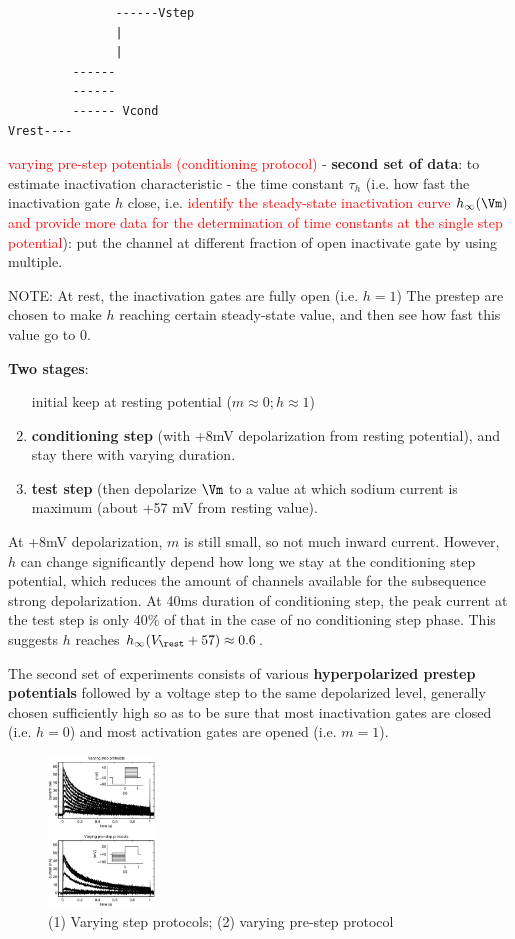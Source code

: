 \begin{verbatim}
               ------Vstep
               |
               |
         ------
         ------
         ------ Vcond
Vrest----
\end{verbatim}

\textcolor{red}{varying pre-step potentials (conditioning protocol)} - {\bf
second set of data}: to estimate inactivation characteristic - the time constant
$\tau_h$ (i.e. how fast the inactivation gate $h$ close, i.e. \textcolor{red}{identify the
steady-state inactivation curve $h_\infty(\Vm)$ and provide more data for the
determination of time constants at the single step potential}):
put the channel at different fraction of open inactivate gate by using multiple.

NOTE: At rest, the inactivation gates are fully open (i.e. $h=1$) The prestep
are chosen to make $h$ reaching certain steady-state value, and then see how
fast this value go to 0.

{\bf Two stages}:
\begin{enumerate}

  \item [initial] keep at resting potential ($m \approx 0; h \approx 1$)

  \item  {\bf conditioning step} (with +8mV depolarization from resting
  potential), and stay there with varying duration.

  \item {\bf test step} (then depolarize $\Vm$ to a value at which sodium
  current is maximum (about +57 mV from resting value).
\end{enumerate}
At +8mV depolarization, $m$ is still small, so not much inward current. However,
$h$ can change significantly depend how long we stay at the conditioning step
potential, which reduces the amount of channels available for the subsequence
strong depolarization. At 40ms duration of conditioning step, the peak
current at the test step is only 40\% of that in the case of no conditioning
step phase. This suggests $h$ reaches $h_\infty(V_\rest+57) \approx 0.6$.

The second set of experiments consists of various {\bf hyperpolarized prestep
potentials} followed by a voltage step to the same depolarized level, generally
chosen sufficiently high so as to be sure that most inactivation gates are
closed (i.e. $h=0$) and most activation gates are opened (i.e. $m=1$).


\begin{figure}[hbt]
  \centerline{\includegraphics[height=4cm,
    angle=0]{./images/voltage-clamp-2ways.eps}}
\caption{(1) Varying step protocols; (2) varying pre-step protocol}
\label{fig:voltage-clamp-2ways}
\end{figure}

